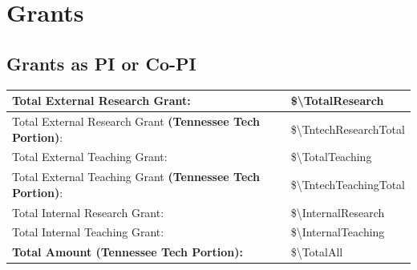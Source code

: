 \section{Grants}

\subsection{Grants as PI or Co-PI}






\begin{table}[!h]
    \centering
    \begin{tabular}{|l|l|}
    \hline
        Total External Research Grant: &  \$\num[group-separator={,}]{\TotalResearch} \\
    \hline        
        Total External Research Grant \textbf{(Tennessee Tech Portion)}: &  \$\num[group-separator={,}]{\TntechResearchTotal} \\
    \hline
    \hline
        Total External Teaching Grant: &  \$\num[group-separator={,}]{\TotalTeaching} \\
    \hline        
        Total External Teaching Grant \textbf{(Tennessee Tech Portion)}: &  \$\num[group-separator={,}]{\TntechTeachingTotal} \\
    \hline
    \hline
        Total Internal Research Grant: &  \$\num[group-separator={,}]{\InternalResearch}\\
    \hline        
        Total Internal Teaching Grant: &  \$\num[group-separator={,}]{\InternalTeaching}\\     
    \hline 
    \hline
        \textbf{Total Amount (Tennessee Tech Portion):} &  \$\num[group-separator={,}]{\TotalAll}\\
    \hline   
    \end{tabular}
    \label{tab:my_label}
\end{table}

